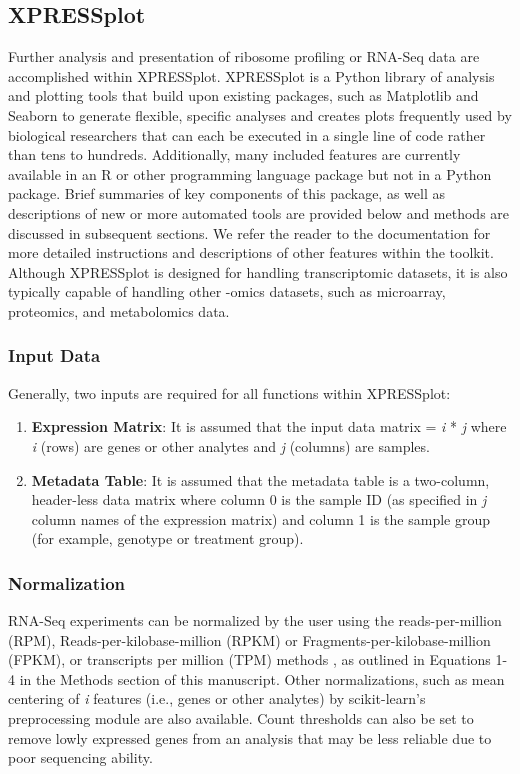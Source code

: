 \documentclass[10pt, oneside]{article}
\begin{document}
\subsection{XPRESSplot}
Further analysis and presentation of ribosome profiling or RNA-Seq data are accomplished within XPRESSplot. XPRESSplot is a Python library of analysis and plotting tools that build upon existing packages, such as Matplotlib \cite{matplotlib} and Seaborn \cite{seaborn} to generate flexible, specific analyses and creates plots frequently used by biological researchers that can each be executed in a single line of code rather than tens to hundreds. Additionally, many included features are currently available in an R or other programming language package but not in a Python package. Brief summaries of key components of this package, as well as descriptions of new or more automated tools are provided below and methods are discussed in subsequent sections. We refer the reader to the documentation \cite{xpressplot_docs} for more detailed instructions and descriptions of other features within the toolkit. Although XPRESSplot is designed for handling transcriptomic datasets, it is also typically capable of handling other -omics datasets, such as microarray, proteomics, and metabolomics data.

\subsubsection{Input Data}
Generally, two inputs are required for all functions within XPRESSplot:

\begin{enumerate}
  \item \textbf{Expression Matrix}: It is assumed that the input data matrix = \textit{i} * \textit{j} where \textit{i} (rows) are genes or other analytes and \textit{j} (columns) are samples.
  \item \textbf{Metadata Table}: It is assumed that the metadata table is a two-column, header-less data matrix where column 0 is the sample ID (as specified in \textit{j} column names of the expression matrix) and column 1 is the sample group (for example, genotype or treatment group).
\end{enumerate}

\subsubsection{Normalization}
RNA-Seq experiments can be normalized by the user using the reads-per-million (RPM), Reads-per-kilobase-million (RPKM) or Fragments-per-kilobase-million (FPKM), or transcripts per million (TPM) methods \cite{evans_briefbio}, as outlined in Equations 1-4 in the Methods section of this manuscript. Other normalizations, such as mean centering of \textit{i} features (i.e., genes or other analytes) by scikit-learn's preprocessing module \cite{scikit_learn} are also available. Count thresholds can also be set to remove lowly expressed genes from an analysis that may be less reliable due to poor sequencing ability.
\end{document}
